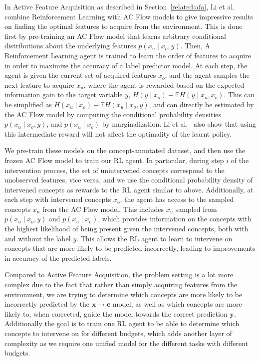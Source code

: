\documentclass[../main.tex]{subfiles}
\begin{document}
In Active Feature Acquisition as described in Section~\ref{related:afa},
Li et al.~\cite{afa} combine Reinforcement Learning with 
AC Flow models to give impressive results on finding the optimal features to acquire from the environment. This is done
first by pre-training an AC Flow model that learns arbitrary conditional distributions about the underlying
features $p(x_u \mid x_o, y)$. Then, A Reinforcement Learning agent is trained to learn 
the order of features to acquire in order to maximize the accuracy of a label predictor model. At each
step, the agent is given the current set of acquired features $x_o$, and the agent samples the next 
feature to acquire $x_u$, where the agent is rewarded based on the expected information gain
to the target variable $y$, $H(y \mid x_o) - \mathbb{E} H(y \mid x_u, x_o)$. This can be simplified as
$H(x_u \mid x_o) - \mathbb{E}H(x_u \mid x_o, y)$, and can directly be estimated by the AC 
Flow model by computing the conditional probability densities $p(x_u \mid x_o, y)$, and 
$p(x_u \mid x_o)$ by marginalization. Li et al.~\cite{afa} 
also show that using this intermediate reward will not affect the optimality of the learnt policy.

We pre-train these models on the concept-annotated dataset, and then use the frozen AC Flow
model to train our RL agent.
In particular, during step $i$ of the intervention process, the set of unintervened concepts correspond 
to the unobserved features, vice versa, and we use the conditional probability density of 
intervened concepts as rewards to the RL agent similar to above. Additionally, at each step
with intervened concepts $x_o$, the agent has access to the sampled concepts $x_u$ from the AC Flow model.
This includes $x_u$ sampled from $p(x_u \mid x_o, y)$ and $p(x_u \mid x_o)$, which provides information
on the concepts with the highest likelihood of being present given the intervened concepts, both with and without
the label $y$.  This allows the RL agent to learn to intervene on concepts that are 
more likely to be predicted incorrectly, leading to improvements in accuracy of the predicted labels.

Compared to Active Feature Acquisition, the problem setting is a lot more complex due to the fact that
rather than simply acquiring features from the environment, we are trying to determine
which concepts are more likely to be incorrectly predicted by the $\mathbf{x} \to \mathbf{c}$ model, as well as 
which concepts are more likely to, when corrected, guide the model towards the correct prediction $\mathbf{y}$.
Additionally the goal is to train one RL agent to be able to determine which concepts
to intervene on for different budgets, which adds another layer of complexity as we require
one unified model for the different tasks with different budgets.
\end{document}
